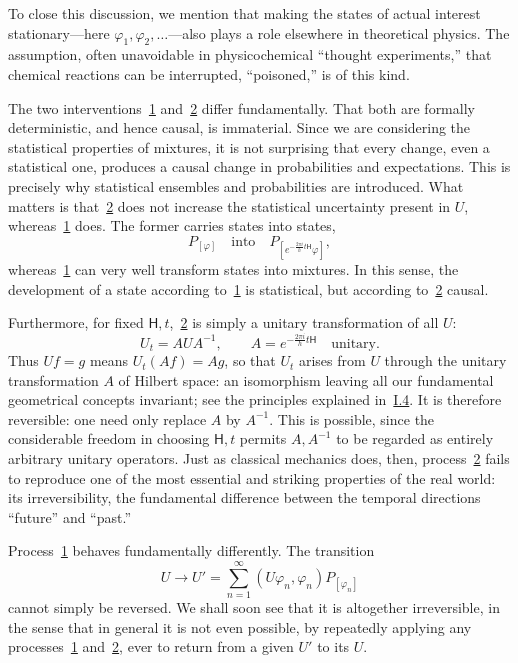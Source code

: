 \documentclass[fontsize=13pt,twoside,openany,headings=normal,parskip=false,bookmarkpackage=false,DIV=calc]{scrbook}
\begin{document}
To close this discussion, we mention that making the states of actual interest stationary---here $\varphi_1,\varphi_2,\ldots$---also plays a role elsewhere in theoretical physics. The assumption, often unavoidable in physicochemical ``thought experiments,'' that chemical reactions can be interrupted, ``poisoned,'' is of this kind.

The two interventions~\hyperref[eq:V.1.1]{1} and~\hyperref[eq:V.1.2]{2} differ fundamentally. That both are formally deterministic, and hence causal, is immaterial. Since we are considering the statistical properties of mixtures, it is not surprising that every change, even a statistical one, produces a causal change in probabilities and expectations. This is precisely why statistical ensembles and probabilities are introduced. What matters is that~\hyperref[eq:V.1.2]{2} does not increase the statistical uncertainty present in $U$, whereas~\hyperref[eq:V.1.1]{1} does. The former carries states into states,
\[
P_{[\varphi]}\quad\text{into}\quad P_{[e^{-\frac{2\pi i}{h}t\mathsf{H}}\varphi]},
\]
whereas~\hyperref[eq:V.1.1]{1} can very well transform states into mixtures. In this sense, the development of a state according to~\hyperref[eq:V.1.1]{1} is statistical, but according to~\hyperref[eq:V.1.2]{2} causal.

Furthermore, for fixed $\mathsf{H},t$,~\hyperref[eq:V.1.2]{2} is simply a unitary transformation of all $U$:
\[
U_t=AUA^{-1},\qquad A=e^{-\frac{2\pi i}{h}t\mathsf{H}}\quad\text{unitary}.
\]
Thus $Uf=g$ means $U_t(Af)=Ag$, so that $U_t$ arises from $U$ through the unitary transformation $A$ of Hilbert space: an isomorphism leaving all our fundamental geometrical concepts invariant; see the principles explained in~\hyperref[sec:I.4]{I.4}. It is therefore reversible: one need only replace $A$ by $A^{-1}$. This is possible, since the considerable freedom in choosing $\mathsf{H},t$ permits $A,A^{-1}$ to be regarded as entirely arbitrary unitary operators. Just as classical
\hypertarget{origpage-191}{}%
mechanics does, then, process~\hyperref[eq:V.1.2]{2} fails to reproduce one of the most essential and striking properties of the real world: its irreversibility, the fundamental difference between the temporal directions ``future'' and ``past.''

Process~\hyperref[eq:V.1.1]{1} behaves fundamentally differently. The transition
\[
U\longrightarrow U'=\sum_{n=1}^{\infty}(U\varphi_n,\varphi_n)P_{[\varphi_n]}
\]
cannot simply be reversed. We shall soon see that it is altogether irreversible, in the sense that in general it is not even possible, by repeatedly applying any processes~\hyperref[eq:V.1.1]{1} and~\hyperref[eq:V.1.2]{2}, ever to return from a given $U'$ to its $U$.
\end{document}
